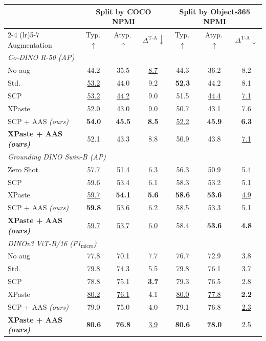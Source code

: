 \begin{tabular}{l ccc ccc}
\toprule
& \multicolumn{3}{c}{Split by COCO NPMI} & \multicolumn{3}{c}{Split by Objects365 NPMI} \\
\cmidrule(lr){2-4} \cmidrule(lr){5-7}
Augmentation & Typ.\,$\uparrow$ & Atyp.\,$\uparrow$ & $\Delta^{\text{T-A}}\downarrow$ & Typ.\,$\uparrow$ & Atyp.\,$\uparrow$ & $\Delta^{\text{T-A}}\downarrow$ \\
\midrule
\multicolumn{7}{l}{\emph{Co-DINO R-50 (AP)}} \\
No aug & 44.2 & 35.5 & \underline{8.7} & 44.3 & 36.2 & 8.2 \\
Std. & \underline{53.2} & 44.0 & 9.2 & \textbf{52.3} & 44.2 & 8.1 \\
SCP & \underline{53.2} & \underline{44.2} & 9.0 & 51.5 & \underline{44.4} & \underline{7.1} \\
XPaste & 52.0 & 43.0 & 9.0 & 50.7 & 43.1 & 7.6 \\
\rowcolor{oursrow} SCP + AAS \emph{(ours)} & \textbf{54.0} & \textbf{45.5} & \textbf{8.5} & \underline{52.2} & \textbf{45.9} & \textbf{6.3} \\
\rowcolor{oursrow} \textbf{XPaste + AAS \emph{(ours)}} & 52.1 & 43.3 & 8.8 & 50.9 & 43.8 & \underline{7.1} \\
\midrule
\multicolumn{7}{l}{\emph{Grounding DINO Swin-B (AP)}} \\
Zero Shot & 57.7 & 51.4 & 6.3 & 56.3 & 50.9 & 5.4 \\
SCP & 59.6 & 53.4 & 6.1 & 58.3 & 53.2 & 5.1 \\
XPaste & \underline{59.7} & \textbf{54.1} & \textbf{5.6} & \textbf{58.6} & \textbf{53.6} & \underline{4.9} \\
\rowcolor{oursrow} SCP + AAS \emph{(ours)} & \textbf{59.8} & 53.6 & 6.2 & \underline{58.5} & \underline{53.3} & 5.1 \\
\rowcolor{oursrow} \textbf{XPaste + AAS \emph{(ours)}} & \underline{59.7} & \underline{53.7} & \underline{6.0} & 58.4 & \textbf{53.6} & \textbf{4.8} \\
\midrule
\multicolumn{7}{l}{\emph{DINOv3 ViT-B/16 (F1$_{\text{micro}}$)}} \\
No aug & 77.8 & 70.1 & 7.7 & 76.7 & 72.9 & 3.8 \\
Std. & 79.8 & 74.3 & 5.5 & 79.8 & 76.1 & 3.7 \\
SCP & 78.8 & 75.1 & \textbf{3.7} & 79.3 & 76.5 & 2.8 \\
XPaste & \underline{80.2} & \underline{76.1} & 4.1 & \underline{80.0} & \underline{77.8} & \textbf{2.2} \\
\rowcolor{oursrow} SCP + AAS \emph{(ours)} & 79.0 & 75.0 & 4.0 & 79.1 & 76.8 & \underline{2.3} \\
\rowcolor{oursrow} \textbf{XPaste + AAS \emph{(ours)}} & \textbf{80.6} & \textbf{76.8} & \underline{3.9} & \textbf{80.6} & \textbf{78.0} & 2.5 \\
\bottomrule
\end{tabular}
